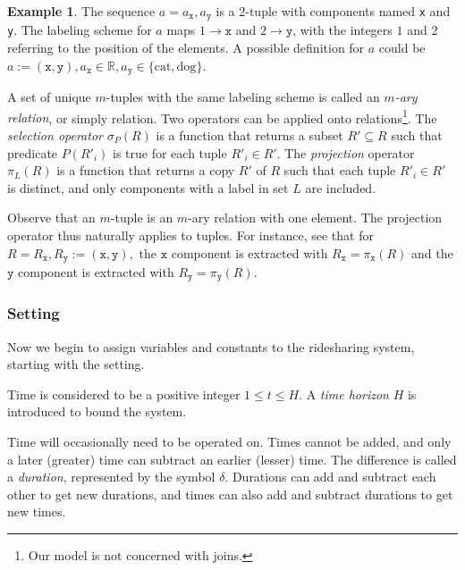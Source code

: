 \documentclass{article}
\newcommand{\hi}[1]{\noindent {\bf #1}}     %
\theoremstyle{definition}                   %
\newtheorem{example}{Example}
\begin{document}
\begin{example}
\label{ex:tuple}
The sequence $a=a_\texttt{x},a_\texttt{y}$
is a 2-tuple with components named \texttt{x} and \texttt{y}.
The labeling
scheme for $a$ maps $1\rightarrow \texttt{x}$ and $2\rightarrow \texttt{y}$, with the
integers $1$ and $2$ referring to the position of the elements. A possible definition for
$a$ could be $a:=(\texttt{x},\texttt{y}),
a_\texttt{x}\in\mathbb{R}, a_\texttt{y}\in\{\textrm{cat},\textrm{dog}\}.$
\end{example}

A set of unique $m$-tuples with the same labeling scheme is called
an \emph{$m$-ary relation}, or simply relation.
Two operators can be applied onto relations\footnote{Our model is not concerned with joins.}.
The \emph{selection operator} $\sigma_P(R)$ is a function that returns a subset
$R'\subseteq R$ such that predicate $P(R'_i)$ is true for each tuple $R'_i\in R'$.
The \emph{projection} operator $\pi_L(R)$ is a function that returns a copy
$R'$ of $R$ such that each tuple $R'_i\in R'$ is distinct, and only components
with a label in set $L$ are included.

Observe that an $m$-tuple is an $m$-ary relation with one element.
The projection operator thus naturally applies to tuples. For instance, see that for
$R=R_\texttt{x},R_\texttt{y}:=(\texttt{x},\texttt{y}),$
the $\texttt{x}$ component is extracted with
$R_\texttt{x}=\pi_\texttt{x}(R)$
and the $\texttt{y}$ component is extracted with
$R_\texttt{y}=\pi_\texttt{y}(R)$.

\subsubsection{Setting}
\label{sec:setting}
Now we begin to assign variables and constants to the ridesharing
system, starting with the setting.

\hi{Time.} Time is considered to be a positive integer $1\leq t\leq H$.  A
\emph{time horizon} $H$ is introduced to bound the system.

Time will occasionally need to be operated on.  Times cannot be added, and only
a later (greater) time can subtract an earlier (lesser) time.  The difference
is called a \emph{duration}, represented by the symbol $\delta$.  Durations can
add and subtract each other to get new durations, and times can also add and
subtract durations to get new times.
\end{document}
